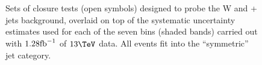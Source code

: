 \clearpage
\begin{figure}[h!]
  \begin{center}
     ~~
     \\
     ~~
     \\
    \caption{Sets of closure tests (open symbols) designed to probe
      the W and \ttbar + jets background, overlaid on top of
      the systematic uncertainty estimates used for each of the seven
      \scalht bins (shaded bands) carried out with $1.28\text{fb}^{-1}$ of
      $13\tev$ data. All events fit into the ``symmetric'' jet
      category.}
    \label{fig:ttWclosureDataSym}
  \end{center} 
\end{figure}

